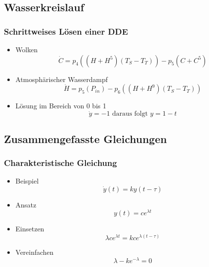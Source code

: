 \documentclass{beamer}
\begin{document}
\subsection{Wasserkreislauf}
\begin{frame}
	\frametitle{Schrittweises Lösen einer DDE}
	\begin{itemize}
		\item[] Wolken
			\begin{equation}
			\dot{C} = p_4 \left( (H + H^5)(T_S - T_T) \right) - p_5 (C + C^5)
			\end{equation} 
			\pause
		\item[] Atmosphärischer Wasserdampf
			\begin{equation}
			\dot{H} = p_5 \left(P_{in} \right) - p_6 \left( (H + H^9 )(T_S - T_T) \right)
			\end{equation}
			\pause
		\item[] Lösung im Bereich von 0 bis 1 
		 	\pause
		 	\begin{equation}
		 	\dot{y}=-1 \textrm{   daraus folgt  } y=1-t
		 	\end{equation} 	
	\end{itemize}
\end{frame}

\subsection{Zusammengefasste Gleichungen}
\begin{frame}
\frametitle{Charakteristische Gleichung}
\begin{itemize}
	\item[] Beispiel
	\begin{equation}
	\dot{y}(t)=ky(t-\tau)
	\end{equation} 
	\item[] Ansatz
	\begin{equation}
	y(t) = ce^{\lambda t}
	\end{equation}
	\pause
	\item[] Einsetzen
	\begin{equation}
	\lambda ce^{\lambda t} = kce^{\lambda (t-\tau )}
	\end{equation} 	
	\pause
	\item[] Vereinfachen
	\begin{equation}
	\lambda  - ke^{-\lambda}= 0
	\end{equation}
\end{itemize}
\end{frame}
\end{document}
